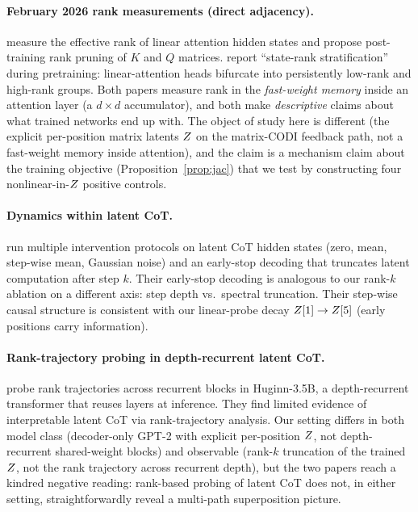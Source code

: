 \paragraph{February 2026 rank measurements (direct adjacency).}
\citet{nazari2026rank} measure the effective rank of linear
attention hidden states and propose post-training rank pruning of
$K$ and $Q$ matrices. \citet{anonymous2026staterank} report
``state-rank stratification'' during pretraining: linear-attention
heads bifurcate into persistently low-rank and high-rank groups.
Both papers measure rank in the \emph{fast-weight memory} inside
an attention layer (a $d \times d$ accumulator), and both make
\emph{descriptive} claims about what trained networks end up with.
The object of study here is different (the explicit per-position
matrix latents $Z$ on the matrix-CODI feedback path, not a
fast-weight memory inside attention), and the claim is a
mechanism claim about the training objective
(Proposition~\ref{prop:jac}) that we test by constructing four
nonlinear-in-$Z$ positive controls.

\paragraph{Dynamics within latent CoT.}
\citet{anonymous2026dynamics} run multiple intervention protocols
on latent CoT hidden states (zero, mean, step-wise mean, Gaussian
noise) and an early-stop decoding that truncates latent
computation after step $k$. Their early-stop decoding is analogous
to our rank-$k$ ablation on a different axis: step depth vs.\
spectral truncation. Their step-wise causal structure is consistent
with our linear-probe decay $Z[1]\to Z[5]$ (early positions carry
information).

\paragraph{Rank-trajectory probing in depth-recurrent latent CoT.}
\citet{lu2025huginn} probe rank trajectories across recurrent
blocks in Huginn-3.5B, a depth-recurrent transformer that reuses
layers at inference. They find limited evidence of interpretable
latent CoT via rank-trajectory analysis. Our setting differs in
both model class (decoder-only GPT-2 with explicit per-position
$Z$, not depth-recurrent shared-weight blocks) and observable
(rank-$k$ truncation of the trained $Z$, not the rank trajectory
across recurrent depth), but the two papers reach a kindred
negative reading: rank-based probing of latent CoT does not, in
either setting, straightforwardly reveal a multi-path
superposition picture.

